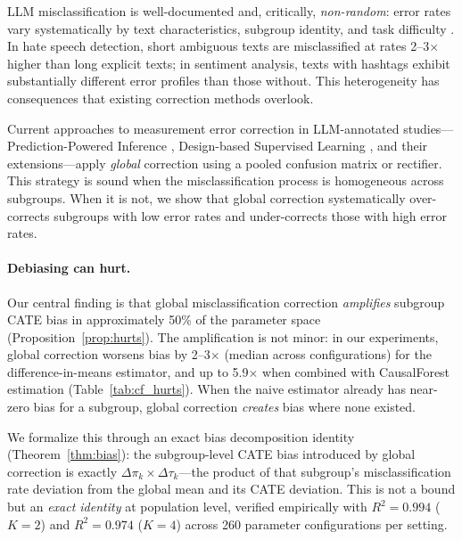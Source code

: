\documentclass[11pt]{article}
\newcommand{\dpi}{\Delta\pi}
\newcommand{\dtau}{\Delta\tau}
\begin{document}
LLM misclassification is well-documented and, critically, \emph{non-random}: error rates vary systematically by text characteristics, subgroup identity, and task difficulty \cite{ashwin2025using}.
In hate speech detection, short ambiguous texts are misclassified at rates 2--3$\times$ higher than long explicit texts; in sentiment analysis, texts with hashtags exhibit substantially different error profiles than those without.
This heterogeneity has consequences that existing correction methods overlook.

Current approaches to measurement error correction in LLM-annotated studies---Prediction-Powered Inference \cite[PPI;][]{angelopoulos2023prediction}, Design-based Supervised Learning \cite[DSL;][]{egami2024using}, and their extensions---apply \emph{global} correction using a pooled confusion matrix or rectifier.
This strategy is sound when the misclassification process is homogeneous across subgroups.
When it is not, we show that global correction systematically over-corrects subgroups with low error rates and under-corrects those with high error rates.

\paragraph{Debiasing can hurt.}
Our central finding is that global misclassification correction \emph{amplifies} subgroup CATE bias in approximately 50\% of the parameter space (Proposition~\ref{prop:hurts}).
The amplification is not minor: in our experiments, global correction worsens bias by 2--3$\times$ (median across configurations) for the difference-in-means estimator, and up to 5.9$\times$ when combined with CausalForest estimation (Table~\ref{tab:cf_hurts}).
When the naive estimator already has near-zero bias for a subgroup, global correction \emph{creates} bias where none existed.

We formalize this through an exact bias decomposition identity (Theorem~\ref{thm:bias}): the subgroup-level CATE bias introduced by global correction is exactly $\dpi_k \times \dtau_k$---the product of that subgroup's misclassification rate deviation from the global mean and its CATE deviation.
This is not a bound but an \emph{exact identity} at population level, verified empirically with $R^2 = 0.994$ ($K{=}2$) and $R^2 = 0.974$ ($K{=}4$) across 260 parameter configurations per setting.
\end{document}
